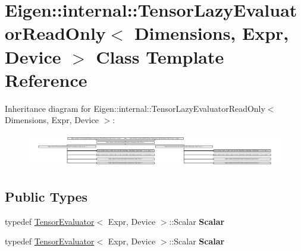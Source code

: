 \hypertarget{class_eigen_1_1internal_1_1_tensor_lazy_evaluator_read_only}{}\section{Eigen\+:\+:internal\+:\+:Tensor\+Lazy\+Evaluator\+Read\+Only$<$ Dimensions, Expr, Device $>$ Class Template Reference}
\label{class_eigen_1_1internal_1_1_tensor_lazy_evaluator_read_only}
Inheritance diagram for Eigen\+:\+:internal\+:\+:Tensor\+Lazy\+Evaluator\+Read\+Only$<$ Dimensions, Expr, Device $>$\+:\begin{figure}[H]
\begin{center}
\leavevmode
\includegraphics[height=1.482602cm]{class_eigen_1_1internal_1_1_tensor_lazy_evaluator_read_only}
\end{center}
\end{figure}
\subsection*{Public Types}
\begin{DoxyCompactItemize}
\item 
\mbox{\label{class_eigen_1_1internal_1_1_tensor_lazy_evaluator_read_only_aac2b0758101d2533c0fca199d22e02c8}} 
typedef \hyperlink{struct_eigen_1_1_tensor_evaluator}{Tensor\+Evaluator}$<$ Expr, Device $>$\+::Scalar {\bfseries Scalar}
\item 
\mbox{\label{class_eigen_1_1internal_1_1_tensor_lazy_evaluator_read_only_aac2b0758101d2533c0fca199d22e02c8}} 
typedef \hyperlink{struct_eigen_1_1_tensor_evaluator}{Tensor\+Evaluator}$<$ Expr, Device $>$\+::Scalar {\bfseries Scalar}
\end{DoxyCompactItemize}
